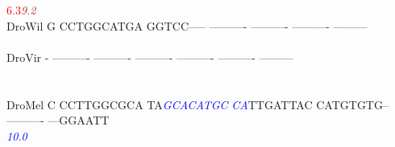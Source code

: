 \documentclass[11pt,twoside,reqno,a4paper]{article}
\begin{document}
{\hspace*{7\charwidth}\hspace*{1\charwidth}\hspace*{1\charwidth}\hspace*{17\charwidth}\textcolor{Red}{6.3}\hspace*{1\charwidth}\hspace*{1\charwidth}\hspace*{17\charwidth}\textit{\textcolor{Brown}{9.2}}\hspace*{1\charwidth}\hspace*{1\charwidth}\\
DroWil	G	CCTGGCATGA	GGTCC-----	----------	----------	----------	---------\\
\hspace*{7\charwidth}\hspace*{1\charwidth}\hspace*{1\charwidth}\hspace*{1\charwidth}\hspace*{1\charwidth}\hspace*{1\charwidth}\hspace*{1\charwidth}\\
DroVir	-	----------	----------	----------	----------	----------	---------\\
\hspace*{7\charwidth}\hspace*{1\charwidth}\hspace*{1\charwidth}\hspace*{1\charwidth}\hspace*{1\charwidth}\hspace*{1\charwidth}\hspace*{1\charwidth}\\
\\
DroMel	C	CCTTGGCGCA	TA\textit{\textcolor{Blue}{G}}\textit{\textcolor{Blue}{C}}\textit{\textcolor{Blue}{A}}\textit{\textcolor{Blue}{C}}\textit{\textcolor{Blue}{A}}\textit{\textcolor{Blue}{T}}\textit{\textcolor{Blue}{G}}\textit{\textcolor{Blue}{C}}	\textit{\textcolor{Blue}{C}}\textit{\textcolor{Blue}{A}}TTGATTAC	CATGTGTG--	----------	---GGAATT\\
\hspace*{7\charwidth}\hspace*{1\charwidth}\hspace*{1\charwidth}\hspace*{13\charwidth}\textit{\textcolor{Blue}{10.0}}\hspace*{1\charwidth}\hspace*{1\charwidth}\hspace*{1\charwidth}\hspace*{1\charwidth}\\
}
\end{document}
